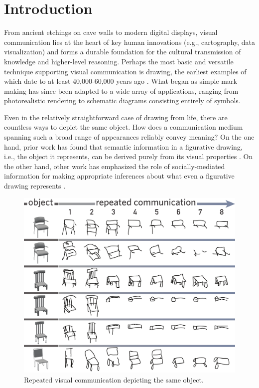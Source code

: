 \documentclass[11pt,letterpaper]{article}
\begin{document}
\section{Introduction}

From ancient etchings on cave walls to modern digital displays, visual communication lies at the heart of key human innovations (e.g., cartography, data visualization) and forms a durable foundation for the cultural transmission of knowledge and higher-level reasoning.
Perhaps the most basic and versatile technique supporting visual communication is drawing, the earliest examples of which date to at least 40,000-60,000 years ago \cite{hoffmann2018u}.
What began as simple mark making has since been adapted to a wide array of applications, ranging from photorealistic rendering to schematic diagrams consisting entirely of symbols.

Even in the relatively straightforward case of drawing from life, there are countless ways to depict the same object.
How does a communication medium spanning such a broad range of appearances reliably convey meaning?
On the one hand, prior work has found that semantic information in a figurative drawing, i.e., the object it represents, can be derived purely from its visual properties \cite{FanCommon2018}.
On the other hand, other work has emphasized the role of socially-mediated information for making appropriate inferences about what even a figurative drawing represents \cite{goodman1976languages}.

\begin{figure}
\begin{center}
\includegraphics[width=0.7\linewidth]{figures/sketch_gallery.pdf}
\caption{Repeated visual communication depicting the same object.}
\label{sketch_gallery}
\end{center}
\end{figure}
\end{document}
